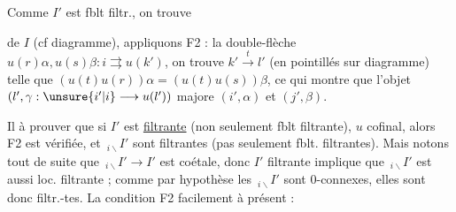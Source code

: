 Comme $I'$ est fblt filtr., on trouve


   de $I$ (cf diagramme), appliquons F2 : la double-flèche $u(r)\alpha,u(s)\beta:i\rightrightarrows u(k')$, on trouve $k'\xrightarrow{t}l'$ (en pointillés sur diagramme) telle que $(u(t)u(r))\alpha=(u(t)u(s))\beta$,  ce qui montre que l'objet $(l',\gamma:\unsure{i'|i}\longrightarrow u(l'))$ majore $(i',\alpha)$ et $(j',\beta)$.


 Il  à prouver que si $I'$ est \uline{filtrante} (non seulement fblt filtrante),    $u$ cofinal, alors F2 est vérifiée, et    $\,{}_{i\backslash}I'$  sont filtrantes (pas seulement fblt. filtrantes).  Mais notons  tout de suite que $\,{}_{i\backslash}I'\longrightarrow I'$ est coétale, donc $I'$ filtrante  implique que $\,{}_{i\backslash}I'$ est aussi loc. filtrante ; comme par hypothèse les $\,{}_{i\backslash}I'$ sont $0$-connexes, elles sont donc filtr.-tes. La condition F2   facilement à présent :


